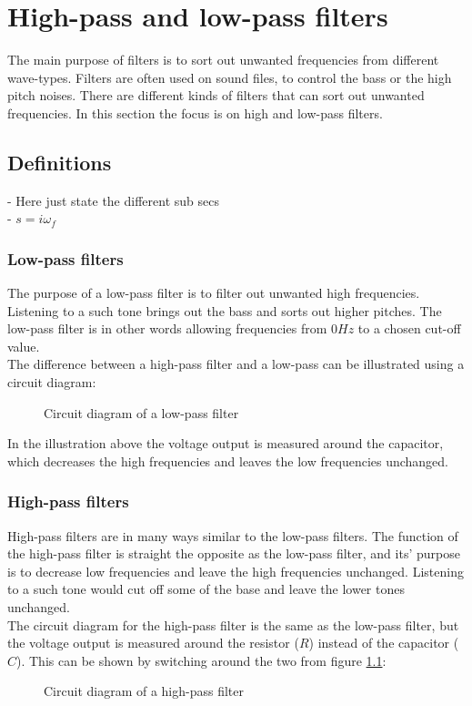 \chapter{High-pass and low-pass filters}
The main purpose of filters is to sort out unwanted frequencies from different wave-types. Filters are often used on sound files, to control the bass or the high pitch noises. There are different kinds of filters that can sort out unwanted frequencies. In this section the focus is on high and low-pass filters.
\section{Definitions}
- Here just state the different sub secs \\
- $s=i \omega_f$
\subsection{Low-pass filters}
The purpose of a low-pass filter is to filter out unwanted high frequencies. Listening to a such tone brings out the bass and sorts out higher pitches. The low-pass filter is in other words allowing frequencies from $0Hz$ to a chosen cut-off value. \\
The difference between a high-pass filter and a low-pass can be illustrated using a circuit diagram:
\begin{figure}[H]
	
	\caption{Circuit diagram of a low-pass filter} \label{lp:diagram}
\end{figure} 
In the illustration above the voltage output is measured around the capacitor, which decreases the high frequencies and leaves the low frequencies unchanged.  
\subsection{High-pass filters}
High-pass filters are in many ways similar to the low-pass filters. The function of the high-pass filter is straight the opposite as the low-pass filter, and its' purpose is to decrease low frequencies and leave the high frequencies unchanged. Listening to a such tone would cut off some of the base and leave the lower tones unchanged. \\
The circuit diagram for the high-pass filter is the same as the low-pass filter, but the voltage output is measured around the resistor ($R$) instead of the capacitor ($C$). This can be shown by switching around the two from figure \ref{lp:diagram}:
\begin{figure}[H]
	
	\caption{Circuit diagram of a high-pass filter}
	\label{hp:diagram}
\end{figure} 
